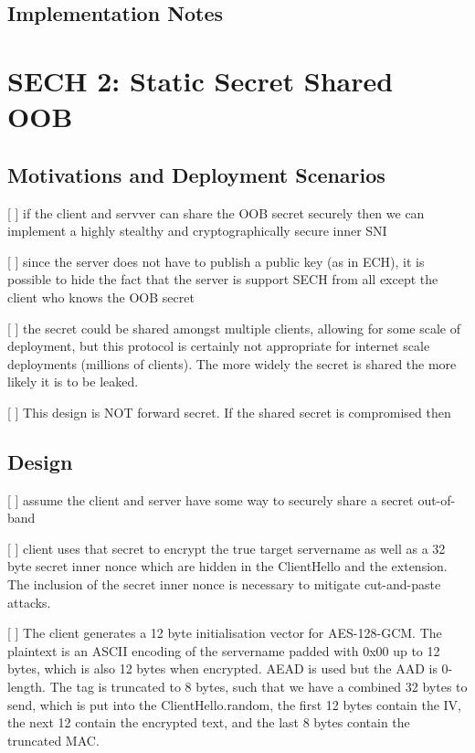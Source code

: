 \subsection{Implementation Notes}
\section{SECH 2: Static Secret Shared OOB}
\subsection{Motivations and Deployment Scenarios}

[ ] if the client and servver can share the OOB secret securely then we can implement a highly stealthy and cryptographically secure inner SNI

[ ] since the server does not have to publish a public key (as in ECH), it is possible to hide the fact that the server is support SECH from all except the client who knows the OOB secret

[ ] the secret could be shared amongst multiple clients, allowing for some scale of deployment, but this protocol is certainly not appropriate for internet scale deployments (millions of clients). The more widely the secret is shared the more likely it is to be leaked.

[ ] This design is NOT forward secret. If the shared secret is compromised then 

\subsection{Design}

[ ] assume the client and server have some way to securely share a secret out-of-band

[ ] client uses that secret to encrypt the true target servername as well as a 32 byte secret inner nonce which are hidden in the ClientHello  and the  extension. The inclusion of the secret inner nonce is necessary to mitigate cut-and-paste attacks.

[ ] The client generates a 12 byte initialisation vector for AES-128-GCM. The plaintext is an ASCII encoding of the servername padded with 0x00 up to 12 bytes, which is also 12 bytes when encrypted.
AEAD is used but the AAD is 0-length. %
The tag is truncated to 8 bytes, such that we have a combined 32 bytes to send, which is put into the ClientHello.random, the first 12 bytes contain the IV, the next 12 contain the encrypted text, and the last 8 bytes contain the truncated MAC.

